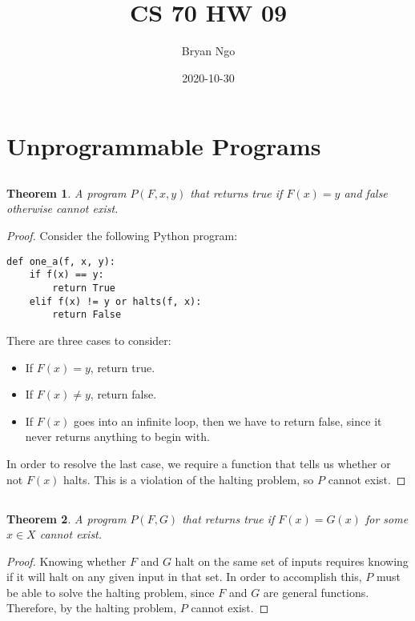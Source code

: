 \documentclass{article}
\title{CS 70 HW 09}
\author{Bryan Ngo}
\date{2020-10-30}
\newtheorem{theorem}{Theorem}
\begin{document}
\maketitle

\section{Unprogrammable Programs}

\subsection{}

\begin{theorem}
    A program \(P(F, x, y)\) that returns true if \(F(x) = y\) and false otherwise cannot exist.
\end{theorem}
\begin{proof}
    Consider the following Python program:
    \begin{lstlisting}
def one_a(f, x, y):
    if f(x) == y:
        return True
    elif f(x) != y or halts(f, x):
        return False
    \end{lstlisting}
    There are three cases to consider:
    \begin{itemize}
        \item If \(F(x) = y\), return true.
        \item If \(F(x) \neq y\), return false.
        \item If \(F(x)\) goes into an infinite loop, then we have to return false, since it never returns anything to begin with.
    \end{itemize}
    In order to resolve the last case, we require a function that tells us whether or not \(F(x)\) halts.
    This is a violation of the halting problem, so \(P\) cannot exist.
\end{proof}

\subsection{}

\begin{theorem}
    A program \(P(F, G)\) that returns true if \(F(x) = G(x)\) for some \(x \in X\) cannot exist.
\end{theorem}
\begin{proof}
    Knowing whether \(F\) and \(G\) halt on the same set of inputs requires knowing if it will halt on any given input in that set.
    In order to accomplish this, \(P\) must be able to solve the halting problem, since \(F\) and \(G\) are general functions.
    Therefore, by the halting problem, \(P\) cannot exist.
\end{proof}
\end{document}
